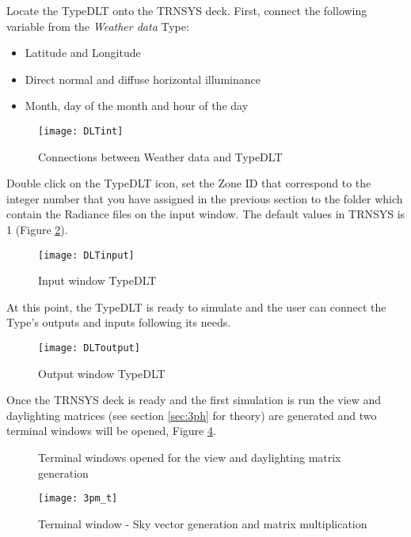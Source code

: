 Locate the TypeDLT onto the TRNSYS deck. First, connect the following variable from the \textit{Weather data} Type: 
\begin{itemize}
\renewcommand{\labelitemi}{\tiny$\blacksquare$}
\item Latitude and Longitude 
\item Direct normal and diffuse horizontal illuminance
\item Month, day of the month and hour of the day
\end{itemize} 

\begin{figure}[h]
\centering
\texttt{[image: DLTint]}
\caption{\label{img5:DLTint} Connections between Weather data and TypeDLT}
\end{figure}


Double click on the TypeDLT icon, set the Zone ID that correspond to the integer number that you have assigned in the previous section to the folder which contain the Radiance files on the input window. The default values in TRNSYS is 1 (Figure \ref{img5:DLTinput}).

\begin{figure}[h]
\centering
\texttt{[image: DLTinput]}
\caption{\label{img5:DLTinput} Input window TypeDLT }
\end{figure}


At this point, the TypeDLT is ready to simulate and the user can connect the Type's outputs and inputs following its needs.\\
\begin{figure}[h]
\centering
\texttt{[image: DLToutput]}
\caption{\label{img5:DLToutput} Output window TypeDLT }
\end{figure}
Once the TRNSYS deck is ready and the first simulation is run the view and daylighting matrices (see section \ref{sec:3ph} for theory) are generated and two terminal windows will be opened, Figure \ref{img5:matrices}.

\begin{figure}[h] 
\centering
  \caption{\label{img5:matrices} Terminal windows opened for the view and daylighting matrix generation}
\end{figure}

\begin{figure}[H]
\centering
\texttt{[image: 3pm\_t]}
\caption{\label{img5:3pm} Terminal window - Sky vector generation and matrix multiplication }
\end{figure}

